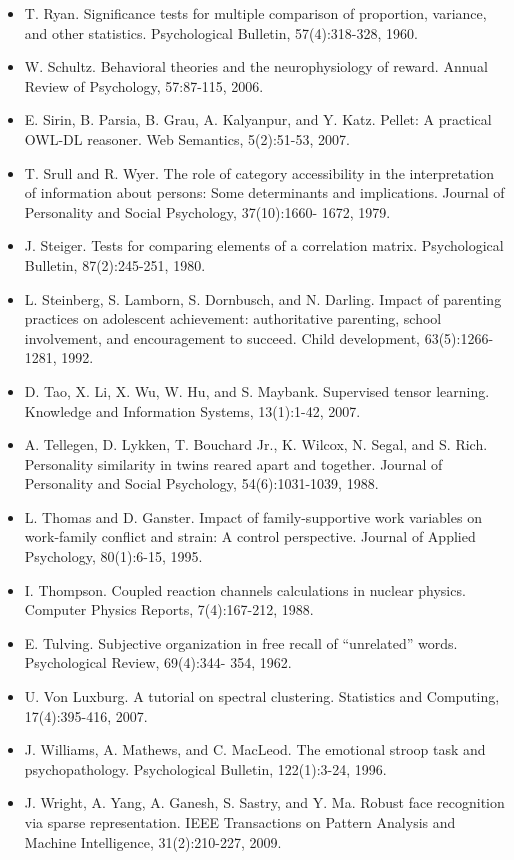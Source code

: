 \documentclass[10pt,letterpaper]{article}
\begin{document}
\begin{itemize}
\item T. Ryan. Significance tests for multiple comparison of proportion, variance, and other statistics. Psychological Bulletin, 57(4):318-328, 1960. %
\item W. Schultz. Behavioral theories and the neurophysiology of reward. Annual Review of Psychology, 57:87-115, 2006. %
\item E. Sirin, B. Parsia, B. Grau, A. Kalyanpur, and Y. Katz. Pellet: A practical OWL-DL reasoner. Web Semantics, 5(2):51-53, 2007. %
\item T. Srull and R. Wyer. The role of category accessibility in the interpretation of information about persons: Some determinants and implications. Journal of Personality and Social Psychology, 37(10):1660- 1672, 1979. %
\item J. Steiger. Tests for comparing elements of a correlation matrix. Psychological Bulletin, 87(2):245-251, 1980. %
\item L. Steinberg, S. Lamborn, S. Dornbusch, and N. Darling. Impact of parenting practices on adolescent achievement: authoritative parenting, school involvement, and encouragement to succeed. Child development, 63(5):1266-1281, 1992. %
\item D. Tao, X. Li, X. Wu, W. Hu, and S. Maybank. Supervised tensor learning. Knowledge and Information Systems, 13(1):1-42, 2007. %
\item A. Tellegen, D. Lykken, T. Bouchard Jr., K. Wilcox, N. Segal, and S. Rich. Personality similarity in twins reared apart and together. Journal of Personality and Social Psychology, 54(6):1031-1039, 1988. %
\item L. Thomas and D. Ganster. Impact of family-supportive work variables on work-family conflict and strain: A control perspective. Journal of Applied Psychology, 80(1):6-15, 1995. %
\item I. Thompson. Coupled reaction channels calculations in nuclear physics. Computer Physics Reports, 7(4):167-212, 1988. %
\item E. Tulving. Subjective organization in free recall of ``unrelated'' words. Psychological Review, 69(4):344- 354, 1962. %
\item U. Von Luxburg. A tutorial on spectral clustering. Statistics and Computing, 17(4):395-416, 2007. %
\item J. Williams, A. Mathews, and C. MacLeod. The emotional stroop task and psychopathology. Psychological Bulletin, 122(1):3-24, 1996. %
\item J. Wright, A. Yang, A. Ganesh, S. Sastry, and Y. Ma. Robust face recognition via sparse representation. IEEE Transactions on Pattern Analysis and Machine Intelligence, 31(2):210-227, 2009. %
\end{itemize}
\end{document}
